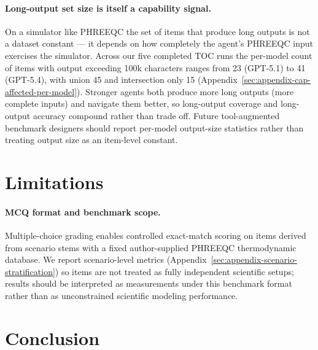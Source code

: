 \documentclass{article}
\begin{document}
\paragraph{Long-output set size is itself a capability signal.}
On a simulator like PHREEQC the set of items that produce long outputs is not a dataset constant — it depends on how completely the agent's PHREEQC input exercises the simulator. Across our five completed TOC runs the per-model count of items with output exceeding 100k characters ranges from 23 (GPT-5.1) to 41 (GPT-5.4), with union 45 and intersection only 15 (Appendix~\ref{sec:appendix-cap-affected-per-model}). Stronger agents both produce more long outputs (more complete inputs) and navigate them better, so long-output coverage and long-output accuracy compound rather than trade off. Future tool-augmented benchmark designers should report per-model output-size statistics rather than treating output size as an item-level constant.

\section{Limitations}

\paragraph{MCQ format and benchmark scope.}
Multiple-choice grading enables controlled exact-match scoring on \BenchN{} items derived from \BenchScenarioN{} scenario stems with a fixed author-supplied PHREEQC thermodynamic database. We report scenario-level metrics (Appendix~\ref{sec:appendix-scenario-stratification}) so items are not treated as fully independent scientific setups; results should be interpreted as measurements under this benchmark format rather than as unconstrained scientific modeling performance.

\section{Conclusion}
\end{document}
